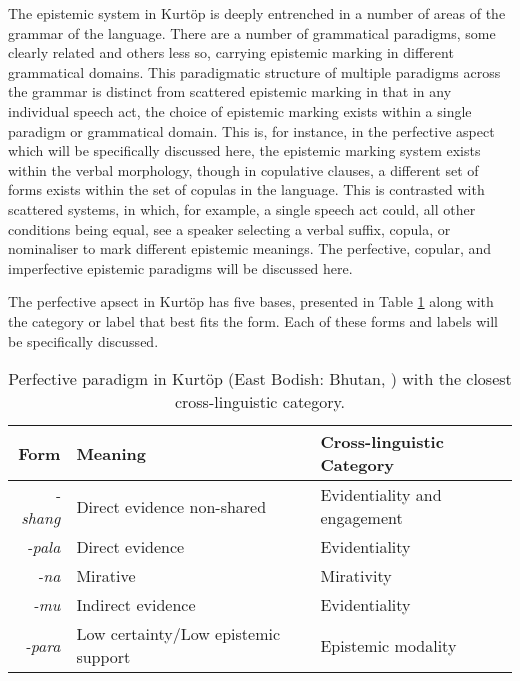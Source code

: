 The epistemic system in Kurtöp is deeply entrenched in a number of areas of the grammar of the language. There are a number of grammatical paradigms, some clearly related and others less so, carrying epistemic marking in different grammatical domains. This paradigmatic structure of multiple paradigms across the grammar is distinct from scattered epistemic marking in that in any individual speech act, the choice of epistemic marking exists within a single paradigm or grammatical domain. This is, for instance, in the perfective aspect which will be specifically discussed here, the epistemic marking system exists within the verbal morphology, though in copulative clauses, a different set of forms exists within the set of copulas in the language. This is contrasted with scattered systems, in which, for example, a single speech act could, all other conditions being equal, see a speaker selecting a verbal suffix, copula, or nominaliser to mark different epistemic meanings. The perfective, copular, and imperfective epistemic paradigms will be discussed here.

The perfective apsect in Kurtöp has five bases, presented in Table \ref{t:Discussion:KurtopPerfective} along with the category or label that best fits the form. Each of these forms and labels will be specifically discussed.
\begin{table}
    \caption{Perfective paradigm in Kurtöp (East Bodish: Bhutan, ) with the closest cross-linguistic category.}
    \label{t:Discussion:KurtopPerfective}
    \begin{tabular}{r l l}

        Form            & Meaning                             & Cross-linguistic Category    \\
        \hline
        \textit{-shang} & Direct evidence non-shared          & Evidentiality and engagement \\
        \textit{-pala}  & Direct evidence                     & Evidentiality                \\
        \textit{-na}    & Mirative                            & Mirativity                   \\
        \textit{-mu}    & Indirect evidence                   & Evidentiality                \\
        \textit{-para}  & Low certainty/Low epistemic support & Epistemic modality           \\
        \hline
    \end{tabular}
\end{table}

